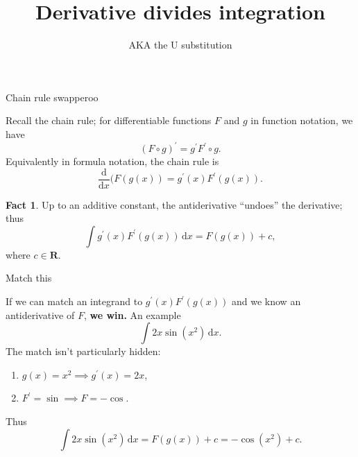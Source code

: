 \documentclass[fleqn]{beamer}
\subtitle{AKA the U substitution}
\title{\textbf{Derivative divides integration}}
\date{}
\newcommand{\reals}{\mathbf{R}}
\theoremstyle{definition}
\newtheorem{myfact}{Fact}
\newenvironment{checklist}{
  \begin{enumerate}[\ding{51}]
    \addtolength{\itemsep}{-0.0\itemsep}}
  {\end{enumerate}}
\begin{document}
\frame{\titlepage}


\begin{frame}{Chain rule swapperoo}
  
Recall the chain rule; for differentiable functions \(F\) and \(g\) in function notation, we have
\[
     (F \circ g)^\prime = g^\prime F^\prime \circ g.
\]  
Equivalently in formula notation, the chain rule is
\[
    \frac{\mathrm{d}}{\mathrm{d} x} (F (g(x)) = g^\prime(x) 
    F^\prime(g(x)).
\]  
\begin{myfact}
Up to an additive constant, the antiderivative ``undoes'' the derivative; thus
\[
\int g^\prime(x) F^\prime(g(x)) \, \mathrm{d} x  =  F (g(x))  + c,
\]   
where \(c \in \reals\).
\end{myfact}
\end{frame} 

\begin{frame}{Match this}

If we can match an integrand to  \(  g^\prime(x) F^\prime(g(x))  \) and we know an antiderivative of \(F\),  \textbf{we win.}  An example
\[
    \int 2 x  \sin(x^2) \, \mathrm{d} x.
\]
The match isn't particularly hidden:

\begin{checklist}
\item \(g(x) = x^2   \implies g^\prime(x) = 2 x\),
\item \(F^\prime = \sin \implies F = -\cos \).
\end{checklist}

Thus
\[
    \int 2 x  \sin(x^2) \, \mathrm{d} x =  F(g(x)) + c = -\cos(x^2) + c.
\]
\end{frame} 
\end{document}

